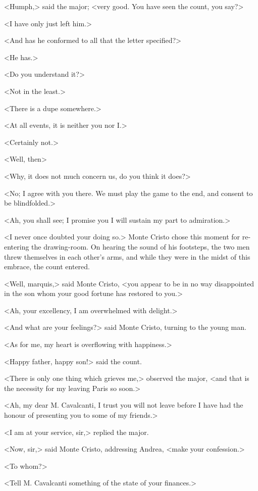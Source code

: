  <Humph,> said the major; <very good. You have seen the count, you say?> 

 <I have only just left him.> 

 <And has he conformed to all that the letter specified?> 

 <He has.> 

 <Do you understand it?> 

 <Not in the least.> 

 <There is a dupe somewhere.> 

 <At all events, it is neither you nor I.> 

 <Certainly not.> 

 <Well, then\longdash> 

 <Why, it does not much concern us, do you think it does?> 

 <No; I agree with you there. We must play the game to the end, and consent to be blindfolded.> 

 <Ah, you shall see; I promise you I will sustain my part to admiration.> 

 <I never once doubted your doing so.> Monte Cristo chose this moment for re-entering the drawing-room. On hearing the sound of his footsteps, the two men threw themselves in each other's arms, and while they were in the midst of this embrace, the count entered. 

 <Well, marquis,> said Monte Cristo, <you appear to be in no way disappointed in the son whom your good fortune has restored to you.> 

 <Ah, your excellency, I am overwhelmed with delight.> 

 <And what are your feelings?> said Monte Cristo, turning to the young man. 

 <As for me, my heart is overflowing with happiness.> 

 <Happy father, happy son!> said the count. 

 <There is only one thing which grieves me,> observed the major, <and that is the necessity for my leaving Paris so soon.> 

 <Ah, my dear M. Cavalcanti, I trust you will not leave before I have had the honour of presenting you to some of my friends.> 

 <I am at your service, sir,> replied the major. 

 <Now, sir,> said Monte Cristo, addressing Andrea, <make your confession.> 

 <To whom?> 

 <Tell M. Cavalcanti something of the state of your finances.> 

